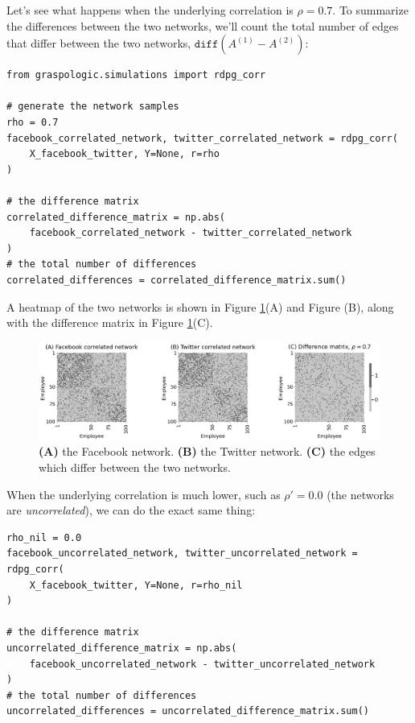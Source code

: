 Let's see what happens when the underlying correlation is $\rho = 0.7$. To summarize the differences between the two networks, we'll count the total number of edges that differ between the two networks, $\texttt{diff}\left(A^{(1)} - A^{(2)}\right)$:

\begin{lstlisting}[style=python]
from graspologic.simulations import rdpg_corr

# generate the network samples
rho = 0.7
facebook_correlated_network, twitter_correlated_network = rdpg_corr(
    X_facebook_twitter, Y=None, r=rho
)

# the difference matrix
correlated_difference_matrix = np.abs(
    facebook_correlated_network - twitter_correlated_network
)
# the total number of differences
correlated_differences = correlated_difference_matrix.sum()
\end{lstlisting}

A heatmap of the two networks is shown in Figure \ref{fig:ch5:rhordpg}(A) and Figure (B), along with the difference matrix in Figure \ref{fig:ch5:rhordpg}(C).

\begin{figure}
    \centering
    \includegraphics[width=\linewidth]{representations/ch5/Images/rhordpg.png}
    \caption[$\rho$-correlated RDPGs]{\textbf{(A)} the Facebook network. \textbf{(B)} the Twitter network. \textbf{(C)} the edges which differ between the two networks.}
    \label{fig:ch5:rhordpg}
\end{figure}
When the underlying correlation is much lower, such as $\rho' = 0.0$ (the networks are \textit{uncorrelated}), we can do the exact same thing:

\begin{lstlisting}[style=python]
rho_nil = 0.0
facebook_uncorrelated_network, twitter_uncorrelated_network = rdpg_corr(
    X_facebook_twitter, Y=None, r=rho_nil
)

# the difference matrix
uncorrelated_difference_matrix = np.abs(
    facebook_uncorrelated_network - twitter_uncorrelated_network
)
# the total number of differences
uncorrelated_differences = uncorrelated_difference_matrix.sum()
\end{lstlisting}

